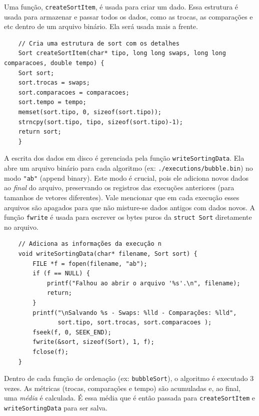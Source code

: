 \documentclass[a4paper]{article}
\begin{document}
    Uma função, \texttt{createSortItem}, é usada para criar um dado. Essa estrutura é usada para armazenar e passar
    todos os dados, como as trocas, as comparações e etc dentro de um arquivo binário. Ela será usada mais a frente.
    \begin{verbatim}
    // Cria uma estrutura de sort com os detalhes
    Sort createSortItem(char* tipo, long long swaps, long long comparacoes, double tempo) {
    Sort sort;
    sort.trocas = swaps;
    sort.comparacoes = comparacoes;
    sort.tempo = tempo;
    memset(sort.tipo, 0, sizeof(sort.tipo));
    strncpy(sort.tipo, tipo, sizeof(sort.tipo)-1);
    return sort;
    }
    \end{verbatim}
    A escrita dos dados em disco é gerenciada pela função \texttt{writeSortingData}. Ela abre um arquivo binário para cada algoritmo (ex: \texttt{./executions/bubble.bin}) no modo \texttt{"ab"} (append binary). Este modo é crucial, pois ele adiciona novos dados ao \textit{final} do arquivo, preservando os registros das execuções anteriores (para tamanhos de vetores diferentes).
    Vale mencionar que em cada execução esses arquivos são apagados para que não misture-se dados antigos com dados novos.
    A função \texttt{fwrite} é usada para escrever os bytes puros da \texttt{struct Sort} diretamente no arquivo.


    \begin{verbatim}
    // Adiciona as informações da execução n
    void writeSortingData(char* filename, Sort sort) {
        FILE *f = fopen(filename, "ab");
        if (f == NULL) {
            printf("Falhou ao abrir o arquivo '%s'.\n", filename);
            return;
        }
        printf("\nSalvando %s - Swaps: %lld - Comparações: %lld",
               sort.tipo, sort.trocas, sort.comparacoes );
        fseek(f, 0, SEEK_END);
        fwrite(&sort, sizeof(Sort), 1, f);
        fclose(f);
    }
    \end{verbatim}

    Dentro de cada função de ordenação (ex: \texttt{bubbleSort}), o algoritmo é executado 3 vezes. As métricas (trocas, comparações e tempo) são acumuladas e, ao final, uma \textit{média} é calculada. É essa média que é então passada para \texttt{createSortItem} e \texttt{writeSortingData} para ser salva.
\end{document}
